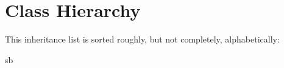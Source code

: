 \section{Class Hierarchy}
This inheritance list is sorted roughly, but not completely, alphabetically\+:\begin{DoxyCompactList}
\item sb\begin{DoxyCompactList}
\item {}
\end{DoxyCompactList}
\end{DoxyCompactList}
